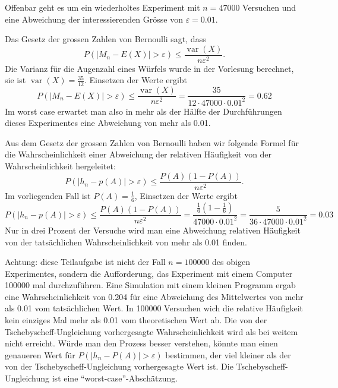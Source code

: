 \begin{loesung}
Offenbar geht es um ein wiederholtes Experiment mit $n=47000$ Versuchen
und eine Abweichung der interessierenden Grösse von $\varepsilon=0.01$.
\begin{teilaufgaben}
\item
Das Gesetz der grossen Zahlen von Bernoulli sagt, dass 
\[
P(|M_n-E(X)|>\varepsilon) \le
\frac{\operatorname{var}(X)}{n\varepsilon^2}.
\]
Die Varianz für die Augenzahl eines Würfels wurde in der Vorlesung berechnet,
sie ist
$\operatorname{var}(X)=\frac{35}{12}.$
Einsetzen der Werte ergibt
\[
P(|M_n-E(X)|>\varepsilon)\le
\frac{\operatorname{var}(X)}{n\varepsilon^2}
=\frac{35}{12\cdot 47000\cdot 0.01^2}=0.62
\]
Im worst case erwartet man also in mehr als der Hälfte der Durchführungen
dieses Experimentes eine Abweichung von mehr als 0.01.
\item
Aus dem Gesetz der grossen Zahlen von Bernoulli haben wir folgende Formel
für die Wahrscheinlichkeit einer Abweichung der relativen Häufigkeit von
der Wahrscheinlichkeit hergeleitet:
\[
P(|h_n-p(A)|>\varepsilon)\le \frac{P(A)(1-P(A))}{n\varepsilon^2}.
\]
Im vorliegenden Fall ist $P(A)=\frac16$, Einsetzen der Werte ergibt
\[
P(|h_n-p(A)|>\varepsilon)\le \frac{P(A)(1-P(A))}{n\varepsilon^2}
=\frac{\frac16(1-\frac16)}{47000\cdot 0.01^2}
=\frac{5}{36\cdot 47000\cdot 0.01^2}
=0.03
\]
Nur in drei Prozent der Versuche wird man eine Abweichung relativen
Häufigkeit von der tatsächlichen Wahrscheinlichkeit von mehr als 0.01
finden.
\item
Achtung: diese Teilaufgabe ist nicht der Fall $n=100000$ des obigen
Experimentes, sondern die Aufforderung, das Experiment mit einem
Computer 100000 mal durchzuführen.
Eine Simulation mit einem kleinen Programm ergab
eine Wahrscheinlichkeit von 0.204 für eine Abweichung des Mittelwertes
von mehr als 0.01 vom tatsächlichen Wert.
In 100000 Versuchen wich die relative Häufigkeit kein einziges
Mal mehr als 0.01 vom theoretischen Wert ab.
Die von der Tschebyscheff-Ungleichung vorhergesagte Wahrscheinlichkeit
wird als bei weitem nicht erreicht.
Würde man den Prozess besser verstehen, könnte man einen genaueren
Wert für $P(|h_n-P(A)|>\varepsilon)$ bestimmen, der viel kleiner als
der von der Tschebyscheff-Ungleichung vorhergesagte Wert ist.
Die Tschebyscheff-Ungleichung ist eine ``worst-case''-Abschätzung.
\qedhere
\end{teilaufgaben}
\end{loesung}


